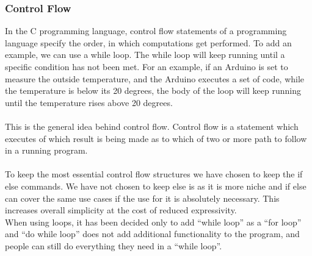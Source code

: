 \subsubsection*{Control Flow}
In the C programming language, control flow statements of a programming language specify the order, in which computations get performed. To add an example, we can use a while loop. The while loop will keep running until a specific condition has not been met. For an example, if an Arduino is set to measure the outside temperature, and the Arduino executes a set of code, while the temperature is below its 20 degrees, the body of the loop will keep running until the temperature rises above 20 degrees.  \\
\\
This is the general idea behind control flow. Control flow is a statement which executes of which result is being made as to which of two or more path to follow in a running program. \\
\\
To keep the most essential control flow structures we have chosen to keep the if else commands. We have not chosen to keep else is as it is more niche and if else can cover the same use cases if the use for it is absolutely necessary. This increases overall simplicity at the cost of reduced expressivity. 
\\
When using loops, it has been decided only to add  “while loop” as a “for loop” and “do while loop” does not add additional functionality to the program, and people can still do everything they need in a “while loop”.
